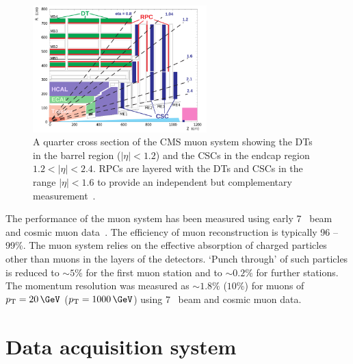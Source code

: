 \begin{figure}
\centering
    \includegraphics[width=0.6\textwidth]{./Figures/detector/muon_sys}
  \caption{A quarter cross section of the CMS muon system showing the DTs in the barrel region ($|\eta| < 1.2$) and the CSCs in the endcap
  region $ 1.2 < |\eta| < 2.4$. RPCs are layered with the DTs and CSCs in the range $|\eta| < 1.6$ to provide an independent but complementary measurement~\cite{CMS}.}
  \label{fig:MUON_SLICE}
\end{figure}

The performance of the muon system has been measured using early 7 \TeV~beam and cosmic muon data~\cite{muon_performance}. 
The efficiency of muon reconstruction is typically 96 -- 99\%. The muon system relies on the effective
absorption of charged particles other than muons in the layers of the detectors.
`Punch through' of such particles is reduced to $\sim 5\%$ for the first muon station and to
$\sim 0.2\%$ for further stations. The momentum resolution 
was measured as $\sim 1.8\%$ ($10\%$) for muons of $\pt=20\,\GeV$ ($\pt=1000\,\GeV$) 
using 7 \TeV~beam and cosmic muon data. 

\section{Data acquisition system}


